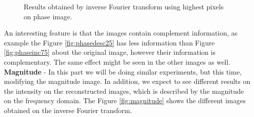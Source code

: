 \documentclass[12pt,a4paper]{article}
\begin{document}
\begin{figure}[!h]
{{		}
		\label{fig:phasedesc50}
	}
	\quad
	
	\caption{Results obtained by inverse Fourier transform using highest pixels on phase image.}
	\label{fig:phaseDESC}
\end{figure}

An interesting feature is that the images contain complement information, as example the Figure \ref{fig:phasedesc25} has less information than Figure \ref{fig:phaseinc75} about the original image, however their information is complementary. The same effect might be seen in the other images as well. \\
	
\textbf{ Magnitude} -  In this part we will be doing similar experiments, but this time, modifying the magnitude image. In addition, we expect to see different results on the intensity on the reconstructed images, which is described by the magnitude on the frequency domain. The Figure \ref{fig:magnitude} shows the different images obtained on the inverse Fourier transform. \\
\end{document}

